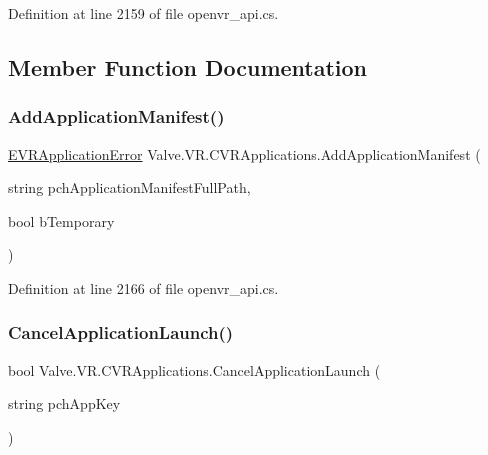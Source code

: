 Definition at line 2159 of file openvr\+\_\+api.\+cs.



\subsection{Member Function Documentation}
\mbox{\label{class_valve_1_1_v_r_1_1_c_v_r_applications_a227ab31b106e3038d88e51fcfaa9380d}} 
\subsubsection{\texorpdfstring{AddApplicationManifest()}{AddApplicationManifest()}}
{\footnotesize\ttfamily \mbox{\hyperlink{namespace_valve_1_1_v_r_a3488adab8a219b579fcee50f4e63a8b6}{E\+V\+R\+Application\+Error}} Valve.\+V\+R.\+C\+V\+R\+Applications.\+Add\+Application\+Manifest (\begin{DoxyParamCaption}\item[{string}]{pch\+Application\+Manifest\+Full\+Path,  }\item[{bool}]{b\+Temporary }\end{DoxyParamCaption})}



Definition at line 2166 of file openvr\+\_\+api.\+cs.

\mbox{\label{class_valve_1_1_v_r_1_1_c_v_r_applications_af537811353d75ea94719196f08fd6729}} 
\subsubsection{\texorpdfstring{CancelApplicationLaunch()}{CancelApplicationLaunch()}}
{\footnotesize\ttfamily bool Valve.\+V\+R.\+C\+V\+R\+Applications.\+Cancel\+Application\+Launch (\begin{DoxyParamCaption}\item[{string}]{pch\+App\+Key }\end{DoxyParamCaption})}



